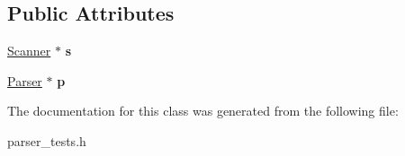 \subsection*{Public Attributes}
\begin{DoxyCompactItemize}
\item 
\hypertarget{class_parser_test_suite_a0c4943b3d23b79be363ba9e1ac7c02ed}{}\hyperlink{class_scanner}{Scanner} $\ast$ {\bfseries s}\label{class_parser_test_suite_a0c4943b3d23b79be363ba9e1ac7c02ed}

\item 
\hypertarget{class_parser_test_suite_a1d637f2f8be1326423ee5b4fd270c553}{}\hyperlink{class_parser}{Parser} $\ast$ {\bfseries p}\label{class_parser_test_suite_a1d637f2f8be1326423ee5b4fd270c553}

\end{DoxyCompactItemize}


The documentation for this class was generated from the following file\+:\begin{DoxyCompactItemize}
\item 
parser\+\_\+tests.\+h\end{DoxyCompactItemize}
